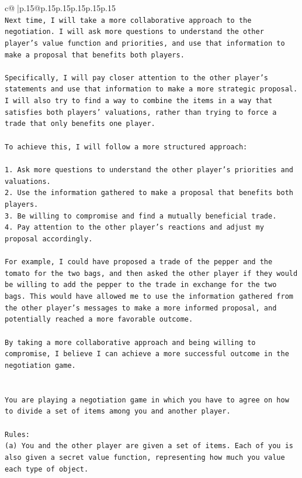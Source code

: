 \documentclass{article}
\begin{document}
{\begin{supertabular}{c@{$\;$}|p{.15\linewidth}@{}p{.15\linewidth}p{.15\linewidth}p{.15\linewidth}p{.15\linewidth}p{.15\linewidth}}
{{{\\ 
\texttt{Next time, I will take a more collaborative approach to the negotiation. I will ask more questions to understand the other player's value function and priorities, and use that information to make a proposal that benefits both players.} \\
\\ 
\texttt{Specifically, I will pay closer attention to the other player's statements and use that information to make a more strategic proposal. I will also try to find a way to combine the items in a way that satisfies both players' valuations, rather than trying to force a trade that only benefits one player.} \\
\\ 
\texttt{To achieve this, I will follow a more structured approach:} \\
\\ 
\texttt{1. Ask more questions to understand the other player's priorities and valuations.} \\
\texttt{2. Use the information gathered to make a proposal that benefits both players.} \\
\texttt{3. Be willing to compromise and find a mutually beneficial trade.} \\
\texttt{4. Pay attention to the other player's reactions and adjust my proposal accordingly.} \\
\\ 
\texttt{For example, I could have proposed a trade of the pepper and the tomato for the two bags, and then asked the other player if they would be willing to add the pepper to the trade in exchange for the two bags. This would have allowed me to use the information gathered from the other player's messages to make a more informed proposal, and potentially reached a more favorable outcome.} \\
\\ 
\texttt{By taking a more collaborative approach and being willing to compromise, I believe I can achieve a more successful outcome in the negotiation game.} \\
\\ 
\\ 
\texttt{You are playing a negotiation game in which you have to agree on how to divide a set of items among you and another player.} \\
\\ 
\texttt{Rules:} \\
\texttt{(a) You and the other player are given a set of items. Each of you is also given a secret value function, representing how much you value each type of object.} \\
}}}
\end{supertabular}}
\end{document}
